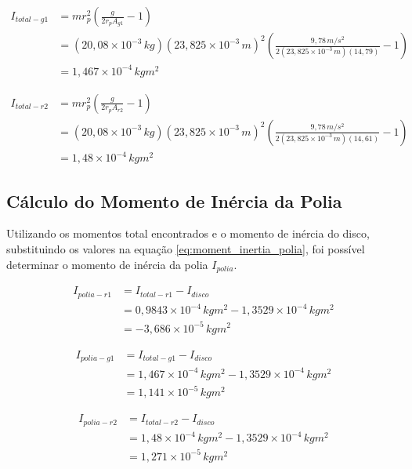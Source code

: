 \documentclass[12pt,a4paper]{article}
\begin{document}
\begin{align}
    I_{total-g1} &= mr_p^2 \left(\frac{g}{2r_p A_{g1}} - 1\right) \nonumber \\
    &= (20,08 \times 10^{-3} \, kg)(23,825 \times 10^{-3} \, m)^2 \left(\frac{9,78 \, m/s^2}{2(23,825 \times 10^{-3} \, m)(14,79)} - 1\right) \nonumber \\
    &= 1,467 \times 10^{-4} \, kg m^2
\end{align}

\begin{align}
    I_{total-r2} &= mr_p^2 \left(\frac{g}{2r_p A_{r2}} - 1\right) \nonumber \\
    &= (20,08 \times 10^{-3} \, kg)(23,825 \times 10^{-3} \, m)^2 \left(\frac{9,78 \, m/s^2}{2(23,825 \times 10^{-3} \, m)(14,61)} - 1\right) \nonumber \\
    &= 1,48 \times 10^{-4} \, kg m^2
\end{align}

\subsection{Cálculo do Momento de Inércia da Polia}
Utilizando os momentos total encontrados e o momento de inércia do disco, substituindo os valores na equação \eqref{eq:moment_inertia_polia}, foi possível determinar o momento de inércia da polia $I_{polia}$.

\begin{align}
    I_{polia-r1} &= I_{total-r1} - I_{disco} \nonumber \\
    &= 0,9843 \times 10^{-4} \, kg m^2 - 1,3529 \times 10^{-4} \, kg m^2 \nonumber\\
    &= -3,686 \times 10^{-5} \, kg m^2
\end{align}

\begin{align}
    I_{polia-g1} &= I_{total-g1} - I_{disco} \nonumber \\
    &= 1,467 \times 10^{-4} \, kg m^2 - 1,3529 \times 10^{-4} \, kg m^2 \nonumber\\
    &= 1,141 \times 10^{-5} \, kg m^2
\end{align}

\begin{align}
    I_{polia-r2} &= I_{total-r2} - I_{disco} \nonumber \\
    &= 1,48 \times 10^{-4} \, kg m^2 - 1,3529 \times 10^{-4} \, kg m^2 \nonumber\\
    &= 1,271 \times 10^{-5} \, kg m^2
\end{align}
\end{document}
